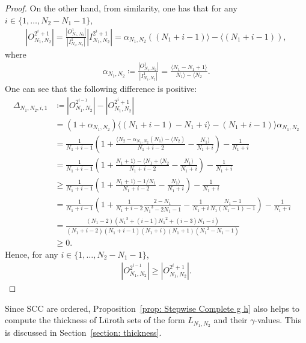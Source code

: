 \documentclass{ws-ijnt}
\begin{document}
\begin{proof}
		On the other hand, from similarity, one has that for any $i\in\{1,\ldots,N_2-N_1-1\}$,
		\begin{align*}
			\left\lvert O_{N_1,N_2}^{2^i+1}\right\rvert
			=\frac{\left\lvert O_{N_1,N_2}^1\right\rvert}{\left\lvert I_{N_1,N_2}^1\right\rvert}\left\lvert I_{N_1,N_2}^{2^i+1}\right\rvert
			=\alpha_{N_1,N_2}\left((N_1+i-1)\rangle-\langle (N_1+i-1)\right)
			,
		\end{align*}
		where
		\begin{align*}
			\alpha_{N_1,N_2}
			\coloneqq\frac{\left\lvert O_{N_1,N_2}^1\right\rvert}{\left\lvert I_{N_1,N_2}^1\right\rvert}
			=\frac{\langle N_1-N_1+1\rangle}{N_1\rangle-\langle N_2}
			.
		\end{align*}
		One can see that the following difference is positive:
		\begin{align*}
			\Delta_{N_1,N_2,i,1}
			&\coloneqq \left\lvert O_{N_1,N_2}^{2^{i-1}}\right\rvert-\left\lvert O_{N_1,N_2}^{2^i+1}\right\rvert \\
			&=\left(1+\alpha_{N_1,N_2}\right)\langle(N_1+i-1)-N_1+i\rangle-(N_1+i-1)\rangle\alpha_{N_1,N_2} \\
			&=\frac{1}{N_1+i-1}\left(1+\frac{\langle N_2-\alpha_{N_1,N_2}(N_1\rangle-\langle N_2)}{N_1+i-2}-\frac{N_1\rangle}{N_1+i}\right)-\frac{1}{N_1+i} \\
			&=\frac{1}{N_1+i-1}\left(1+\frac{N_1+1\rangle-\langle N_1+\langle N_2}{N_1+i-2}-\frac{N_1\rangle}{N_1+i}\right)-\frac{1}{N_1+i} \\
			&\geq\frac{1}{N_1+i-1}\left(1+\frac{N_1+1\rangle-1/N_1}{N_1+i-2}-\frac{N_1\rangle}{N_1+i}\right)-\frac{1}{N_1+i} \\
			&=\frac{1}{N_1+i-1}\left(1+\frac{1}{N_1+i-2}\frac{2-N_1}{{N_1}^{3}-2N_1-1}-\frac{1}{N_1+i}\frac{N_1-1}{N_1\left(N_1-1\right)-1}\right)-\frac{1}{N_1+i} \\
			&=\frac{(N_1-2)\left({N_1}^3+(i-1){N_1}^2+(i-3)N_1-i\right)}{(N_1+i-2)(N_1+i-1)(N_1+i)(N_1+1)({N_1}^2-N_1-1)} \\
			&\geq0
			.
		\end{align*}
		Hence, for any $i\in\{1,\ldots,N_2-N_1-1\}$,
		\begin{align*}
			\left\lvert O_{N_1,N_2}^{2^{i-1}}\right\rvert
			\geq\left\lvert O_{N_1,N_2}^{2^i+1}\right\rvert.
		\end{align*}
	\end{proof}
	Since SCC are ordered, Proposition~\ref{prop: Stepwise Complete g h} also helps to compute the thickness of L\"uroth sets of the form $L_{N_1,N_2}$ and their $\gamma$-values. This is discussed in Section~\ref{section: thickness}.
	
\end{document}
